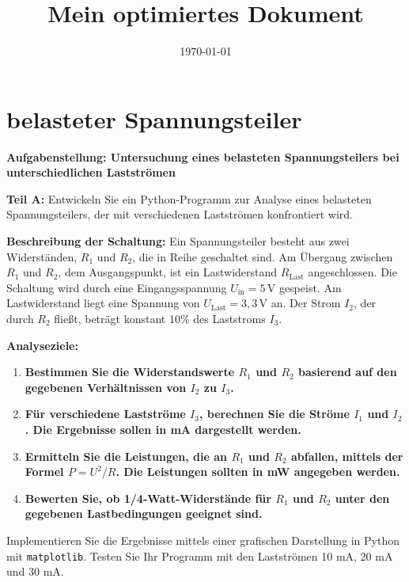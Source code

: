 \documentclass[12pt,a4paper]{scrartcl}
\title{Mein optimiertes Dokument}
\date{\today}
\newcommand{\tightlist}{
  \setlength{\itemsep}{0pt}\setlength{\parskip}{0pt}
}
\begin{document}
\maketitle

\hypertarget{belasteter-spannungsteiler}{%
\section{belasteter Spannungsteiler}\label{belasteter-spannungsteiler}}

\textbf{Aufgabenstellung: Untersuchung eines belasteten Spannungsteilers
bei unterschiedlichen Lastströmen}

\textbf{Teil A:} Entwickeln Sie ein Python-Programm zur Analyse eines
belasteten Spannungsteilers, der mit verschiedenen Lastströmen
konfrontiert wird.

\textbf{Beschreibung der Schaltung:} Ein Spannungsteiler besteht aus
zwei Widerständen, \(R_1\) und \(R_2\), die in Reihe geschaltet sind. Am
Übergang zwischen \(R_1\) und \(R_2\), dem Ausgangspunkt, ist ein
Lastwiderstand \(R_{\text{Last}}\) angeschlossen. Die Schaltung wird
durch eine Eingangsspannung \(U_{\text{in}} = 5 \, \text{V}\) gespeist.
Am Lastwiderstand liegt eine Spannung von
\(U_{\text{Last}} = 3,3 \, \text{V}\) an. Der Strom \(I_2\), der durch
\(R_2\) fließt, beträgt konstant 10\% des Laststroms \(I_3\).

\textbf{Analyseziele:}

\begin{enumerate}
\def\labelenumi{\alph{enumi})}
\tightlist
\item
  \textbf{Bestimmen Sie die Widerstandswerte \(R_1\) und \(R_2\)
  basierend auf den gegebenen Verhältnissen von \(I_2\) zu \(I_3\).}\\
\item
  \textbf{Für verschiedene Lastströme \(I_3\), berechnen Sie die Ströme
  \(I_1\) und \(I_2\). Die Ergebnisse sollen in mA dargestellt
  werden.}\\
\item
  \textbf{Ermitteln Sie die Leistungen, die an \(R_1\) und \(R_2\)
  abfallen, mittels der Formel \(P = U^2/R\). Die Leistungen sollten in
  mW angegeben werden.}\\
\item
  \textbf{Bewerten Sie, ob 1/4-Watt-Widerstände für \(R_1\) und \(R_2\)
  unter den gegebenen Lastbedingungen geeignet sind.}
\end{enumerate}

Implementieren Sie die Ergebnisse mittels einer grafischen Darstellung
in Python mit {\lstinline!matplotlib!}. Testen Sie Ihr
Programm mit den Lastströmen 10 mA, 20 mA und 30 mA.
\end{document}
